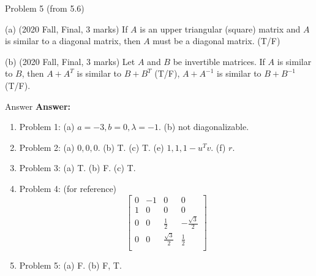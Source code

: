 \documentclass{beamer}
\begin{document}
\begin{frame}{Problem 5 (from 5.6)}
\begin{example}

    (a) (2020 Fall, Final, 3 marks) If $A$ is an upper triangular (square) matrix and $A$ is similar to a diagonal matrix, then $A$ must be a diagonal matrix. (T/F)

    \vspace{3pt}
    (b) (2020 Fall, Final, 3 marks) Let $A$ and $B$ be invertible matrices. If $A$ is similar to $B$, then $A+A^T$ is similar to $B+B^T$ (T/F), $A+A^{-1}$ is similar to $B+B^{-1}$ (T/F).

\end{example}
\end{frame}

\begin{frame}{Answer}
\textbf{Answer:}
\begin{enumerate}
    \item Problem 1: (a) $a=-3, b=0, \lambda=-1$. (b) not diagonalizable.
    \item Problem 2: (a) $0, 0, 0$. (b) T. (c) T. (e) $1, 1, 1-u^Tv$. (f) $r$.
    \item Problem 3: (a) T. (b) F. (c) T.
    \item Problem 4: (for reference)
    \begin{equation*}
        \left[ \begin{matrix}
            0&		-1&		0&		0\\
            1&		0&		0&		0\\
            0&		0&		\frac{1}{2}&		-\frac{\sqrt{3}}{2}\\
            0&		0&		\frac{\sqrt{3}}{2}&		\frac{1}{2}\\
        \end{matrix} \right]
    \end{equation*}
    \item Problem 5: (a) F. (b) F, T.
\end{enumerate}
\end{frame}
\end{document}
